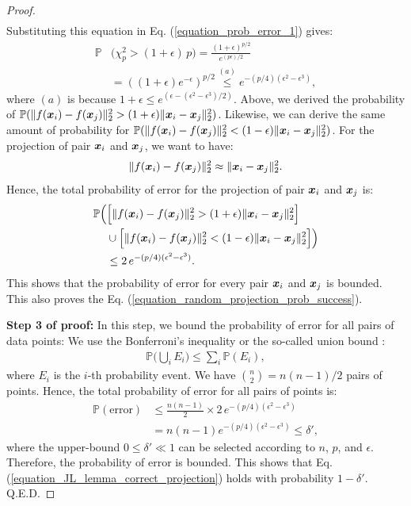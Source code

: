 \documentclass{article}
\def\b{\ensuremath\boldsymbol}
\begin{document}
\begin{proof}
\begin{align*}
\end{align*}
Substituting this equation in Eq. (\ref{equation_prob_error_1}) gives:
\begin{align*}
\mathbb{P}&\Big(\chi_p^2 > (1+\epsilon)\, p\Big) = \frac{(1+\epsilon)^{p/2}}{e^{(p \epsilon) / 2}} \\
&= ((1+\epsilon) e^{-\epsilon})^{p/2} \overset{(a)}{\leq} e^{-(p/4) (\epsilon^2 - \epsilon^3)},
\end{align*}
where $(a)$ is because $1+\epsilon \leq e^{(\epsilon - (\epsilon^2 - \epsilon^3)/2)}$. 
Above, we derived the probability of $\mathbb{P}(\|f(\b{x}_i) - f(\b{x}_j)\|_2^2 > (1+\epsilon) \|\b{x}_i - \b{x}_j\|_2^2)$.
Likewise, we can derive the same amount of probability for $\mathbb{P}(\|f(\b{x}_i) - f(\b{x}_j)\|_2^2 < (1-\epsilon) \|\b{x}_i - \b{x}_j\|_2^2)$. 
For the projection of pair $\b{x}_i$ and $\b{x}_j$, we want to have:
\begin{align}
\|f(\b{x}_i) - f(\b{x}_j)\|_2^2 \approx \|\b{x}_i - \b{x}_j\|_2^2.
\end{align}
Hence, the total probability of error for the projection of pair $\b{x}_i$ and $\b{x}_j$ is:
\begin{align}
\mathbb{P}\Big(&\Big[\|f(\b{x}_i) - f(\b{x}_j)\|_2^2 > (1+\epsilon) \|\b{x}_i - \b{x}_j\|_2^2\Big] \nonumber\\
&\cup
\Big[\|f(\b{x}_i) - f(\b{x}_j)\|_2^2 < (1-\epsilon) \|\b{x}_i - \b{x}_j\|_2^2\Big] \Big) \nonumber\\
&\leq 2\, e^{-(p/4) (\epsilon^2 - \epsilon^3)}. \label{equation_JL_prob_error_twoPoints}
\end{align}
This shows that the probability of error for every pair $\b{x}_i$ and $\b{x}_j$ is bounded. This also proves the Eq. (\ref{equation_random_projection_prob_success}).

\hfill \break
\textbf{Step 3 of proof:}
In this step, we bound the probability of error for all pairs of data points:
We use the Bonferroni's inequality or the so-called union bound \cite{bonferroni1936teoria}:
\begin{align}\label{equation_Bonferroni_inequality}
\mathbb{P}\Big(\bigcup_i E_i\Big) \leq \sum_{i} \mathbb{P}(E_i),
\end{align}
where $E_i$ is the $i$-th probability event. We have $\binom{n}{2} = n(n-1)/2$ pairs of points. Hence, the total probability of error for all pairs of points is:
\begin{align}
\mathbb{P}(\text{error}) &\leq \frac{n(n-1)}{2} \times 2\, e^{-(p/4) (\epsilon^2 - \epsilon^3)} \nonumber\\
&= n(n-1) e^{-(p/4) (\epsilon^2 - \epsilon^3)} \leq \delta', \label{equation_prob_error_JL_lemma}
\end{align}
where the upper-bound $0 \leq \delta' \ll 1$ can be selected according to $n$, $p$, and $\epsilon$. Therefore, the probability of error is bounded. This shows that Eq. (\ref{equation_JL_lemma_correct_projection}) holds with probability $1-\delta'$. Q.E.D.
\end{proof}
\end{document}
